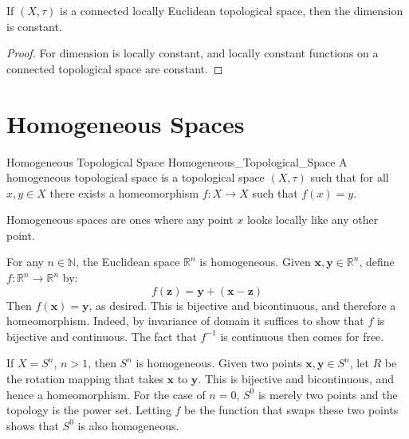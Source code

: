 \documentclass[oneside]{book}                                                  %
\begin{document}
            \begin{theorem}
                If $(X,\tau)$ is a connected locally Euclidean topological
                space, then the dimension is constant.
            \end{theorem}
            \begin{proof}
                For dimension is locally constant, and locally constant
                functions on a connected topological space are constant.
            \end{proof}
        \section{Homogeneous Spaces}
            \begin{fdefinition}{Homogeneous Topological Space}
                               {Homogeneous_Topological_Space}
                A homogeneous topological space is a topological space
                $(X,\tau)$ such that for all $x,y\in{X}$ there exists a
                homeomorphism $f:X\rightarrow{X}$ such that $f(x)=y$.
            \end{fdefinition}
            Homogeneous spaces are ones where any point $x$ looks locally like
            any other point.
            \begin{example}
                For any $n\in\mathbb{N}$, the Euclidean space $\mathbb{R}^{n}$
                is homogeneous. Given $\mathbf{x},\mathbf{y}\in\mathbb{R}^{n}$,
                define $f:\mathbb{R}^{n}\rightarrow\mathbb{R}^{n}$ by:
                \begin{equation}
                    f(\mathbf{z})=\mathbf{y}+(\mathbf{x}-\mathbf{z})
                \end{equation}
                Then $f(\mathbf{x})=\mathbf{y}$, as desired. This is bijective
                and bicontinuous, and therefore a homeomorphism. Indeed, by
                invariance of domain it suffices to show that $f$ is bijective
                and continuous. The fact that $f^{\minus{1}}$ is continuous then
                comes for free.
            \end{example}
            \begin{example}
                If $X=S^{n}$, $n>1$, then $S^{n}$ is homogeneous. Given two
                points $\mathbf{x},\mathbf{y}\in{S}^{n}$, let $R$ be the
                rotation mapping that takes $\mathbf{x}$ to $\mathbf{y}$. This
                is bijective and bicontinuous, and hence a homeomorphism. For
                the case of $n=0$, $S^{0}$ is merely two points and the topology
                is the power set. Letting $f$ be the function that swaps these
                two points shows that $S^{0}$ is also homogeneous.
            \end{example}
\end{document}
